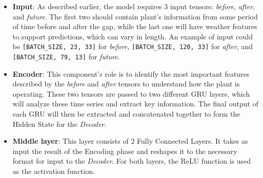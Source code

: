 \begin{itemize}
	\item \textbf{Input}: As described earlier, the model requires 3 input tensors: \textit{before}, \textit{after}, and \textit{future}. The first two should contain plant's information from some period of time before and after the gap, while the last one will have weather features to support predictions, which can vary in length. An example of input could be \verb|[BATCH_SIZE, 23, 33]| for \textit{before}, \verb|[BATCH_SIZE, 120, 33]| for \textit{after}, and \verb|[BATCH_SIZE, 79, 13]| for \textit{future}.

	\item \textbf{Encoder}: This component's role is to identify the most important features described by the \textit{before} and \textit{after} tensors to understand how the plant is operating. These two tensors are passed to two different GRU \cite{gru2} layers, which will analyze these time series and extract key information. The final output of each GRU will then be extracted and concatenated together to form the Hidden State for the \textit{Decoder}.

	\item \textbf{Middle layer}: This layer consists of 2 Fully Connected Layers. It takes as input the result of the Encoding phase and reshapes it to the necessary format for input to the \textit{Decoder}. For both layers, the ReLU \cite{functions} function is used as the activation function.


\end{itemize}
